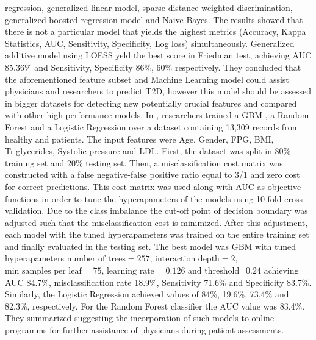 \documentclass[journal,article,submit,pdftex,moreauthors]{Definitions/mdpi}
\begin{document}
regression, generalized linear model, sparse distance weighted discrimination,
generalized boosted regression model and  Naive Bayes. The results showed that
there is not a particular model that yields the highest metrics (Accuracy, 
Kappa Statistics, AUC, Sensitivity, Specificity, Log loss) simultaneously.
Generalized additive model using LOESS yeld the best score in Friedman test,
achieving AUC 85.36\% and Sensitivity, Specificity 86\%, 60\% respectively. They
concluded that the aforementioned feature subset and Machine Learning model could
assist physicians and researchers to predict T2D, however this model should be 
assessed in bigger datasets  for detecting new potentially crucial features and 
compared with other high performance models. In \cite{Lai}, researchers trained a GBM
, a Random Forest and a Logistic Regression over a dataset containing 13,309 records
from healthy and patients. The input features were Age, Gender, FPG, BMI, Triglycerides,
Systolic pressure and LDL. First, the dataset was split in 80\% training set and
20\% testing set. Then, a misclassification cost matrix was constructed with a false
negative-false positive ratio equal to 3/1 and zero cost for correct predictions.
This cost matrix was used along with AUC as objective functions in order to tune the 
hyperapameters of the models using 10-fold cross validation. Due to the class imbalance
the cut-off point of decision boundary was adjusted such that the misclassification cost
is minimized. After this adjustment, each model with the tuned hyperapameters was 
trained on the entire training set and finally evaluated in the testing set. The
best model was GBM with tuned hyperapameters $\textrm{number of trees}=257$, 
$\textrm{interaction depth}=2$, $\textrm{min samples per leaf}= 75$, 
$\textrm{learning rate}=0.126$ and $\textrm{threshold=0.24}$ achieving AUC 84.7\%,
misclassification rate 18.9\%, Sensitivity 71.6\% and Specificity 83.7\%. Similarly,
the Logistic Regression achieved values of 84\%, 19.6\%, 73,4\% and 82.3\%,
respectively. For the Random Forest classifier the AUC value was 83.4\%. They 
summarized suggesting the incorporation of such models to online programms for 
further assistance of physicians during patient assessments.
\end{document}
